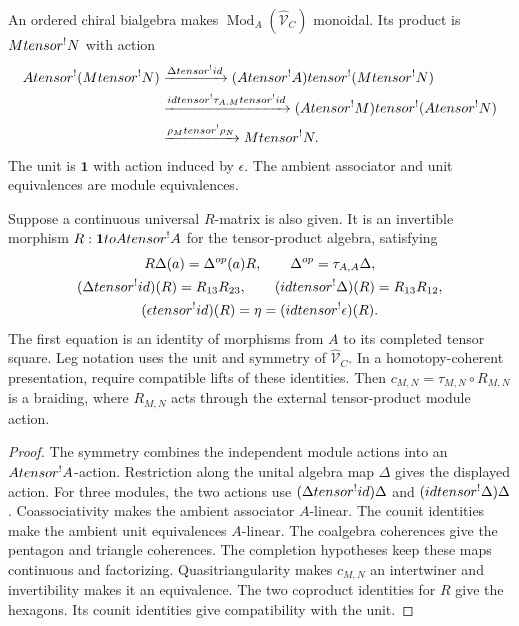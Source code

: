 \begin{theorem}\label{thm:vol4-representation-fusion}
An ordered chiral bialgebra makes
$\operatorname{Mod}_A(\widehat{\mathcal V}_C)$ monoidal.
Its product is $Mtensor^{!}N$ with action
\[
\begin{aligned}
 Atensor^{!}(Mtensor^{!}N)
 &\xrightarrow{\Delta tensor^{!}id}
 (Atensor^{!}A)tensor^{!}
 (Mtensor^{!}N)\\
 &\xrightarrow{idtensor^{!}\tau_{A,M}
                       tensor^{!}id}
 (Atensor^{!}M)tensor^{!}
 (Atensor^{!}N)\\
 &\xrightarrow{\rho_Mtensor^{!}\rho_N}
 Mtensor^{!}N.
\end{aligned}
\]
The unit is $\mathbf1$ with action induced by $\epsilon$.
The ambient associator and unit equivalences are module equivalences.

Suppose a continuous universal $R$-matrix is also given.
It is an invertible morphism
$R:\mathbf1to Atensor^{!}A$ for the tensor-product algebra,
satisfying
\[
\begin{gathered}
 R\Delta(a)=\Delta^{op}(a)R,\qquad
 \Delta^{op}=\tau_{A,A}\Delta,\\
 (\Delta tensor^{!}id)(R)=R_{13}R_{23},
 \qquad
 (idtensor^{!}\Delta)(R)=R_{13}R_{12},\\
 (\epsilon tensor^{!}id)(R)=\eta
 =(idtensor^{!}\epsilon)(R).
\end{gathered}
\]
The first equation is an identity of morphisms from $A$ to its completed tensor square.
Leg notation uses the unit and symmetry of $\widehat{\mathcal V}_C$.
In a homotopy-coherent presentation, require compatible lifts of these identities.
Then $c_{M,N}=\tau_{M,N}\circ R_{M,N}$ is a braiding,
where $R_{M,N}$ acts through the external tensor-product module action.
\end{theorem}
\begin{proof}
The symmetry combines the independent module actions into an
$Atensor^{!}A$-action.
Restriction along the unital algebra map $\Delta$ gives the displayed action.
For three modules, the two actions use
$(\Delta tensor^{!}id)\Delta$ and
$(idtensor^{!}\Delta)\Delta$.
Coassociativity makes the ambient associator $A$-linear.
The counit identities make the ambient unit equivalences $A$-linear.
The coalgebra coherences give the pentagon and triangle coherences.
The completion hypotheses keep these maps continuous and factorizing.
Quasitriangularity makes $c_{M,N}$ an intertwiner and invertibility makes it an equivalence.
The two coproduct identities for $R$ give the hexagons.
Its counit identities give compatibility with the unit.
\end{proof}


